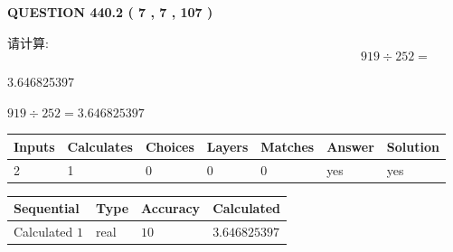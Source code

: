 \documentclass{ctexart}
\begin{document}
   
  
\vspace{0.2in}
  
{\textbf{\Large{QUESTION
440.2 
 ( 7 , 7 , 107 )
}}}
  
  
 
请计算:
\begin{equation}
919  \div    %
252 = \nonumber
\end{equation}
 
 
 
\noindent{}
 
 

3.646825397
 
 
\noindent{}
 
 

 
 
 
\noindent{}
 
 

$ %
919 \div  %
252=   %
3.646825397$
 
 
\noindent{}
 
 

 
   
   
   
   
\noindent\begin{tabular}{|l|l|l|l|l|l|l|}
 \hline
Inputs & Calculates & Choices & Layers & Matches & Answer & Solution \\ \hline
 2  & 
 1  & 
 0
  & 
 0  & 
 0  & 
  yes & 
  yes 
  \\ \hline
 \end{tabular}
   
   
   
   
\noindent{}
   
   
  
  
\noindent\begin{tabular}{|l|l|l|l|}
\hline
 Sequential & Type & Accuracy & Calculated \\ 
\hline
 
 
  Calculated $  1 $ & real & $  10  $ & 
 $ 3.646825397 $ 
 \\  \hline  
 \end{tabular}
   
\end{document}
